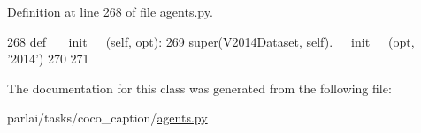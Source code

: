 Definition at line 268 of file agents.\+py.


\begin{DoxyCode}
268     \textcolor{keyword}{def }\_\_init\_\_(self, opt):
269         super(V2014Dataset, self).\_\_init\_\_(opt, \textcolor{stringliteral}{'2014'})
270 
271 
\end{DoxyCode}


The documentation for this class was generated from the following file\+:\begin{DoxyCompactItemize}
\item 
parlai/tasks/coco\+\_\+caption/\hyperlink{parlai_2tasks_2coco__caption_2agents_8py}{agents.\+py}\end{DoxyCompactItemize}
